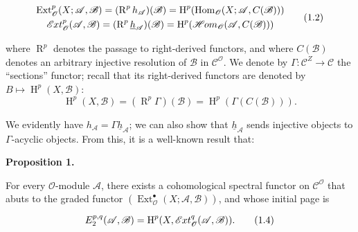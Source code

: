 \documentclass{article}
\newenvironment{itenv}[1]
  {\phantomsection\par\smallskip\noindent\textbf{#1.}\itshape}
  {\par\smallskip}
\newenvironment{eqenv}
  {}
  {}
\newcommand{\oldpage}[1]{\marginpar{\footnotesize$\Big\vert$ \textit{p.~#1}}}
\theoremstyle{definition}
\theoremstyle{definition}
\theoremstyle{definition}
\theoremstyle{definition}
\theoremstyle{remark}
\begin{document}
\leavevmode{}%
\begin{eqenv}
\[
  \begin{gathered}
    \operatorname{Ext}_{\mathscr{O}}^p(X;{\mathscr{A}},{\mathscr{B}}) = (\operatorname{R}^p h_{\mathscr{A}})({\mathscr{B}}) = \operatorname{H}^p(\operatorname{Hom}_{\mathscr{O}}(X;{\mathscr{A}},C({\mathscr{B}})))
  \\\mathscr{E}\kern -.5pt xt_{\mathscr{O}}^p({\mathscr{A}},{\mathscr{B}}) = (\operatorname{R}^p \underline{h}_{\mathscr{A}})({\mathscr{B}}) = \operatorname{H}^p(\mathscr{H}\kern -.5pt om_{\mathscr{O}}({\mathscr{A}},C({\mathscr{B}})))
  \end{gathered}
\tag{1.2}
\]

\end{eqenv}

where \(\operatorname{R}^p\) denotes the passage to right-derived functors, and where \(C({\mathscr{B}})\) denotes an arbitrary injective resolution of \({\mathscr{B}}\) in \({\mathcal{C}}^{\mathscr{O}}\).
We denote by \(\Gamma\colon{\mathcal{C}}^Z\to{\mathcal{C}}\) the ``sections'' functor;
recall that its right-derived functors are denoted by \(B\mapsto\operatorname{H}^p(X,{\mathscr{B}})\):
\[
  \operatorname{H}^p(X,{\mathscr{B}}) = (\operatorname{R}^p\Gamma)({\mathscr{B}}) = \operatorname{H}^p(\Gamma(C({\mathscr{B}}))).
\tag{1.3}
\]

\oldpage{149-02}We evidently have \(h_{\mathscr{A}}=\Gamma\underline{h}_{\mathscr{A}}\);
we can also show that \(\underline{h}_{\mathscr{A}}\) sends injective objects to \(\Gamma\)-acyclic objects.
From this, it is a well-known result that:

\hypertarget{fga-1-proposition-1}{}
\begin{itenv}{Proposition 1}

For every \({\mathscr{O}}\)-module \({\mathscr{A}}\), there exists a cohomological spectral functor on \({\mathcal{C}}^{\mathscr{O}}\) that abuts to the graded functor \((\operatorname{Ext}_{\mathscr{O}}^\bullet(X;{\mathscr{A}},{\mathscr{B}}))\), and whose initial page is

\leavevmode{}%
\begin{eqenv}
\[
  E_2^{p,q}({\mathscr{A}},{\mathscr{B}}) = \operatorname{H}^p(X,\mathscr{E}\kern -.5pt xt_{\mathscr{O}}^q({\mathscr{A}},{\mathscr{B}})).
\tag{1.4}
\]

\end{eqenv}

\end{itenv}
\end{document}
